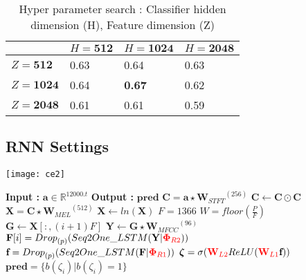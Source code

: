 \begin{table}[H]
\label{tab:a2}
\centering
\begin{tabular}{| p{} | p{}| p{}| p{} |}
\hline
& $H = \textbf{512}$ & $H = \textbf{1024}$ & $H = \textbf{2048}$\\
\hline
$Z = \textbf{512}$  & 0.63 & 0.64 & 0.63\\
\hline
$Z = \textbf{1024}$ & 0.64 & \textbf{0.67 }& 0.62\\ 
\hline
$Z = \textbf{2048}$ & 0.61 & 0.61 & 0.59\\
\hline
\end{tabular}
\caption{Hyper parameter search : Classifier hidden dimension (H), Feature dimension (Z)} 
\end{table}

\subsection{RNN Settings}

\begin{algorithm}
\begin{minipage}{0.15\textwidth}
\texttt{[image: ce2]}
\end{minipage}
  \begin{minipage}{0.80\textwidth}
  \caption{$\textbf{pred}$ = $Model$($\textbf{a}$) }\label{exp:a3}
   {\fontsize{8}{0}
  \begin{algorithmic}[1]
    \Statex \textbf{Input :} $\textbf{a} \in \mathbb{R}^{12000.t}$
    \Statex \textbf{Output :} $\textbf{pred}$ 
    \State $\textbf{C} = \textbf{a} \star {\textbf{W}_{STFT}}^{(256)}$ 
    \State $\textbf{C} \leftarrow \textbf{C} \odot \textbf{C}$
    \State $\textbf{X} = \textbf{C} \star {\textbf{W}_{MEL}}^{(512)}$ 
    \State $\textbf{X} \leftarrow ln(\textbf{X})$
    \State $F = 1366$
    \State $W = floor(\frac{P}{F})$
      \State $ \textbf{G} \leftarrow \textbf{X}[:,(i+1)F]$
      \State $\textbf{Y} \leftarrow \textbf{G} \star {\textbf{W}_{MFCC}}^{(96)}$ 
      \State $\textbf{F}[i] = {Drop}_{(p)}(Seq2One\_LSTM(\textbf{Y} | {\color{red}\bm{\Phi}_{R2}} ))$ 
    \EndFor
    \State $\textbf{f} = {Drop}_{(p)}(Seq2One\_LSTM(\textbf{F} | {\color{red}\bm{\Phi}_{R1}}))$ 
    \State $\bm{\zeta} = \sigma ({\color{red} \textbf{W}_{L2}} ReLU ({\color{red}\textbf{W}_{L1}}\textbf{f})) $ 
    \State $\textbf{pred} = \{ b(\zeta_{i}) | b(\zeta_{i}) = 1 \}$ 
  \end{algorithmic}
  }
  \end{minipage}
\end{algorithm}
\FloatBarrier

